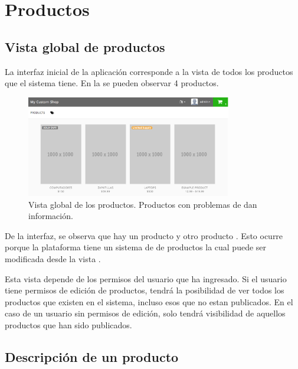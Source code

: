 
\section{Productos}

	\subsection{Vista global de productos}\label{chapter:section:productos:subsection:vista_global}
		La interfaz inicial de la aplicación corresponde a la vista de todos los productos que el sistema tiene. En la  se pueden observar 4 productos.

		\begin{figure}[H]
			\centering
			\includegraphics[width=0.8\textwidth]{figuras/solution/product/global_view/view.png}

			\caption{Vista global de los productos. Productos con problemas de \stock dan información.}
			\label{figure:solution:product:global_view:view}
		\end{figure}

		De la interfaz, se observa que hay un producto \soldoutEF y otro producto \limitedStockEF. Esto ocurre porque la plataforma tiene un sistema de \trackingCPT de productos la cual puede ser modificada desde la vista .


		Esta vista depende de los permisos del usuario que ha ingresado. Si el usuario tiene permisos de edición de productos, tendrá la posibilidad de ver todos los productos que existen en el sistema, incluso esos que no estan publicados. En el caso de un usuario sin permisos de edición, solo tendrá visibilidad de aquellos productos que han sido publicados.

	\subsection{Descripción de un producto}\label{chapter:section:productos:subsection:descripcion}

